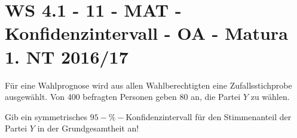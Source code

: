 \section{WS 4.1 - 11 - MAT - Konfidenzintervall - OA - Matura 1. NT 2016/17}

\begin{beispiel}[WS 4.1]{1} %
Für eine Wahlprognose wird aus allen Wahlberechtigten eine Zufallsstichprobe ausgewählt. Von 400 befragten Personen geben 80 an, die Partei $Y$ zu wählen.

Gib ein symmetrisches $95-\%-$Konfidenzintervall für den Stimmenanteil der Partei $Y$ in der Grundgesamtheit an!

\end{beispiel}